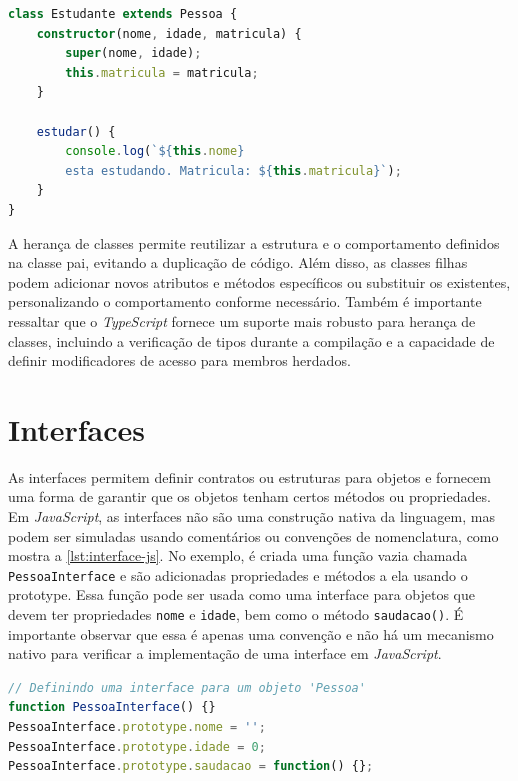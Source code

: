 \Needspace{0.3\textheight}
\begin{lstlisting}[language=TypeScript, caption=Herança de classes em \textit{JavaScript}, label=lst:heranca-js]
class Estudante extends Pessoa {
    constructor(nome, idade, matricula) {
        super(nome, idade);
        this.matricula = matricula;
    }
    
    estudar() {
        console.log(`${this.nome} 
        esta estudando. Matricula: ${this.matricula}`);
    }
}
\end{lstlisting}


A herança de classes permite reutilizar a estrutura e o comportamento definidos na classe pai, evitando a duplicação de código. Além disso, as classes filhas podem adicionar novos atributos e métodos específicos ou substituir os existentes, personalizando o comportamento conforme necessário. Também é importante ressaltar que o \textit{TypeScript} fornece um suporte mais robusto para herança de classes, incluindo a verificação de tipos durante a compilação e a capacidade de definir modificadores de acesso para membros herdados.


\section{Interfaces}
\label{JS_interfaces}
As interfaces permitem definir contratos ou estruturas para objetos e fornecem uma forma de garantir que os objetos tenham certos métodos ou propriedades. Em \textit{JavaScript}, as interfaces não são uma construção nativa da linguagem, mas podem ser simuladas usando comentários ou convenções de nomenclatura, como mostra a \autoref{lst:interface-js}. No exemplo, é criada uma função vazia chamada \texttt{PessoaInterface} e são adicionadas propriedades e métodos a ela usando o prototype. Essa função pode ser usada como uma interface para objetos que devem ter propriedades \texttt{nome} e \texttt{idade}, bem como o método \texttt{saudacao()}. É importante observar que essa é apenas uma convenção e não há um mecanismo nativo para verificar a implementação de uma interface em \textit{JavaScript}.

\begin{lstlisting}[language=TypeScript, caption=Simulação de Interface em JS., label=lst:interface-js]
// Definindo uma interface para um objeto 'Pessoa'
function PessoaInterface() {}
PessoaInterface.prototype.nome = '';
PessoaInterface.prototype.idade = 0;
PessoaInterface.prototype.saudacao = function() {};
\end{lstlisting}

